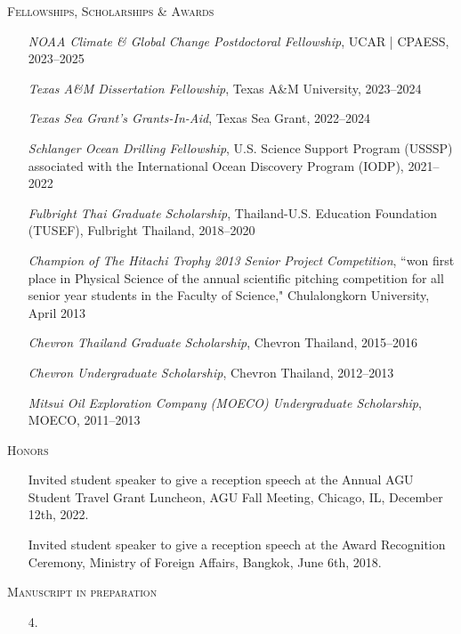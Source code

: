 \documentclass[10pt, letter]{article}
\newcommand{\margintext}[1]{\marginnote{\normalsize\textbf #1 |}}
\begin{document}
\pagestyle{fancy}

\fancyfoot{} %

\bigskip
\margintext{Awards}
\textsc{Fellowships, Scholarships \& Awards}
\begin{itemize}[leftmargin=*]
    \item[] \emph{NOAA Climate \& Global Change Postdoctoral Fellowship}, UCAR | CPAESS, 2023–2025
    \item[] \emph{Texas A\&M Dissertation Fellowship}, Texas A\&M University, 2023–2024
    \item[] \emph{Texas Sea Grant's Grants-In-Aid}, Texas Sea Grant, 2022–2024
    \item[] \emph{Schlanger Ocean Drilling Fellowship}, U.S. Science Support Program (USSSP) associated with the International Ocean Discovery Program (IODP), 2021–2022
    \item[] \emph{Fulbright Thai Graduate Scholarship}, Thailand-U.S. Education Foundation (TUSEF), Fulbright Thailand, 2018–2020
    \item[] \emph{Champion of The Hitachi Trophy 2013 Senior Project Competition}, ``won first place in Physical Science of the annual scientific pitching competition for all senior year students in the Faculty of Science," Chulalongkorn University, April 2013
    \item[] \emph{Chevron Thailand Graduate Scholarship}, Chevron Thailand, 2015–2016
    \item[] \emph{Chevron Undergraduate Scholarship}, Chevron Thailand, 2012–2013
    \item[] \emph{Mitsui Oil Exploration Company (MOECO) Undergraduate Scholarship}, MOECO, 2011–2013 

\end{itemize}

\textsc{Honors}
\begin{itemize}[leftmargin=*]
    \item[] Invited student speaker to give a reception speech at the Annual AGU Student Travel Grant Luncheon, AGU Fall Meeting, Chicago, IL, December 12th, 2022.
    \item[] Invited student speaker to give a reception speech at the Award Recognition Ceremony, Ministry of Foreign Affairs, Bangkok, June 6th, 2018.
\end{itemize}

\bigskip
\margintext{Publications} \textsc{Manuscript in preparation}
\begin{enumerate}
\item[4.] 
\end{enumerate}
\end{document}

